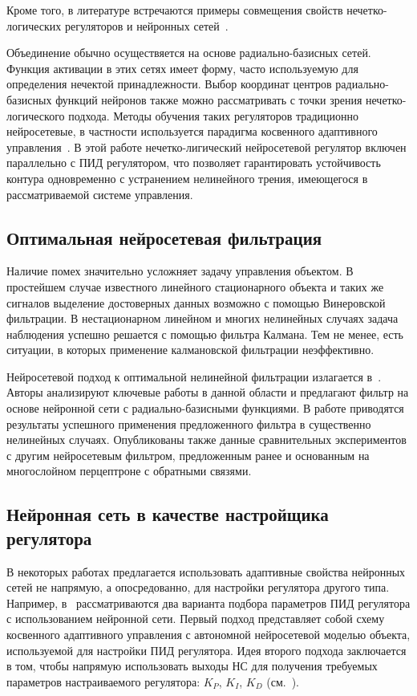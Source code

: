Кроме того, в литературе встречаются примеры совмещения свойств
нечетко-{логичес\-ких} регуляторов и нейронных
сетей~\cite{sigom00,linwaihong01}.

Объединение обычно осуществяется на основе радиально-базисных сетей.
Функция активации в этих сетях имеет форму, часто используемую для
определения нечектой принадлежности.  Выбор координат центров
радиально-базисных функций нейронов также можно рассматривать с точки
зрения нечетко-логического подхода.  Методы обучения таких регуляторов
традиционно нейросетевые, в частности используется парадигма
косвенного адаптивного управления~\cite{wailinlin00}.  В этой работе
нечетко-лигический нейросетевой регулятор включен параллельно с ПИД
регулятором, что позволяет гарантировать устойчивость контура
одновременно с устранением нелинейного трения, имеющегося в
рассматриваемой системе управления.

\subsection{Оптимальная нейросетевая фильтрация}

Наличие помех значительно усложняет задачу управления объектом.  В
простейшем случае известного линейного стационарного объекта и таких
же сигналов выделение достоверных данных возможно с помощью
Винеровской фильтрации.  В нестационарном линейном и многих нелинейных
случаях задача наблюдения успешно решается с помощью фильтра Калмана.
Тем не менее, есть ситуации, в которых применение калмановской
фильтрации неэффективно.

Нейросетевой подход к оптимальной нелинейной фильтрации излагается
в~\cite{hayyeeder97}.  Авторы анализируют ключевые работы в данной
области и предлагают фильтр на основе нейронной сети с
радиально-базисными функциями.  В работе приводятся результаты
успешного применения предложенного фильтра в существенно нелинейных
случаях.  Опубликованы также данные сравнительных экспериментов с
другим нейросетевым фильтром, предложенным ранее и основанным на
многослойном перцептроне с обратными связями.


\subsection{Нейронная сеть в качестве настройщика регулятора}

В некоторых работах предлагается использовать адаптивные свойства
нейронных сетей не напрямую, а опосредованно, для настройки регулятора
другого типа.  Например, в~\cite{samtar96} рассматриваются два
варианта подбора параметров ПИД регулятора с использованием нейронной
сети.  Первый подход представляет собой схему косвенного адаптивного
управления с автономной нейросетевой моделью объекта, используемой для
настройки ПИД регулятора.  Идея второго подхода заключается в том,
чтобы напрямую использовать выходы НС для получения требуемых
параметров настраиваемого регулятора: $K_P$, $K_I$, $K_D$
(см.~).

